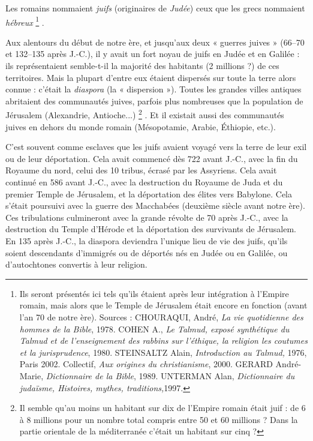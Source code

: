  Les romains nommaient \emph{juifs} (originaires de \emph{Judée}) ceux que les grecs nommaient \emph{hébreux}%
\footnote{Ils seront présentés ici tels qu'ils étaient après leur intégration à l'Empire romain, mais alors que le Temple de Jérusalem était encore en fonction (avant l'an 70 de notre ère).
Sources : CHOURAQUI, André, \emph{La vie quotidienne des hommes de la Bible}, 1978. COHEN A., \emph{Le Talmud, exposé synthétique du Talmud et de l'enseignement des rabbins sur l'éthique, la religion les coutumes et la jurisprudence}, 1980. STEINSALTZ Alain, \emph{Introduction au Talmud,} 1976, Paris 2002. Collectif, \emph{Aux origines du christianisme}, 2000. GERARD André-Marie, \emph{Dictionnaire de la Bible}, 1989. UNTERMAN Alan, \emph{Dictionnaire du judaïsme, Histoires, mythes, traditions,}1997.}%
.

 Aux alentours du début de notre ère, et jusqu'aux deux « guerres juives » (\hbox{66--70} et \hbox{132--135} après J.-C.), il y avait un fort noyau de juifs en Judée et en Galilée : ils représentaient semble-t-il la majorité des habitants (2 millions ?) de ces territoires. Mais la plupart d'entre eux étaient dispersés sur toute la terre alors connue : c'était la \emph{diaspora} (la « dispersion »). Toutes les grandes villes antiques abritaient des communautés juives, parfois plus nombreuses que la population de Jérusalem (Alexandrie, Antioche...)%
\footnote{Il semble qu'au moins un habitant sur dix de l'Empire romain était juif : de 6 à 8 millions pour un nombre total compris entre 50 et 60 millions ? Dans la partie orientale de la méditerranée c'était un habitant sur cinq ?}%
. Et il existait aussi des communautés juives en dehors du monde romain (Mésopotamie, Arabie, Éthiopie, etc.).

 C'est souvent comme esclaves que les juifs avaient voyagé vers la terre de leur exil ou de leur déportation. Cela avait commencé dès 722 avant J.-C., avec la fin du Royaume du nord, celui des 10 tribus, écrasé par les Assyriens. Cela avait continué en 586 avant J.-C., avec la destruction du Royaume de Juda et du premier Temple de Jérusalem, et la déportation des élites vers Babylone. Cela s'était poursuivi avec la guerre des Macchabées (deuxième siècle avant notre ère). Ces tribulations culmineront avec la grande révolte de 70 après J.-C., avec la destruction du Temple d'Hérode et la déportation des survivants de Jérusalem. En 135 après J.-C., la diaspora deviendra l'unique lieu de vie des juifs, qu'ils soient descendants d'immigrés ou de déportés nés en Judée ou en Galilée, ou d'autochtones convertis à leur religion. 

